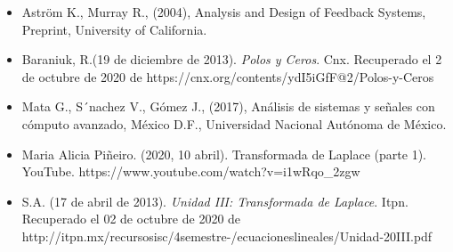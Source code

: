 \begin{itemize}
	\item Aström K., Murray R., (2004), Analysis and Design of Feedback Systems, Preprint, University of California.
	\item Baraniuk, R.(19 de diciembre de 2013).\textit{ Polos y Ceros}. Cnx. Recuperado el 2 de octubre de 2020 de
	\subitem https://cnx.org/contents/ydI5iGfF@2/Polos-y-Ceros	
	\item Mata G., S´nachez V., Gómez J., (2017), Análisis de sistemas y señales con cómputo avanzado, México D.F., Universidad Nacional Autónoma de México.
	\item Maria Alicia Piñeiro. (2020, 10 abril). Transformada de Laplace (parte 1). YouTube. 
	\subitem https://www.youtube.com/watch?v=i1wRqo\_2zgw
	
	\item	S.A. (17 de abril de 2013).\textit{ Unidad III: Transformada de Laplace}. Itpn. Recuperado el 02 de octubre de 2020 de http://itpn.mx/recursosisc/4semestre-/ecuacioneslineales/Unidad-20III.pdf
\end{itemize}